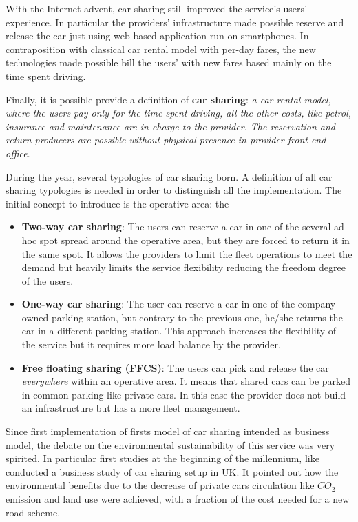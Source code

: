 With the Internet advent, car sharing still improved the service's users' experience. In particular the providers' infrastructure made possible reserve and release the car just using web-based application run on smartphones. 
In contraposition with classical car rental model with per-day fares, the new technologies made possible bill the users' with new fares based mainly on the time spent driving. 

Finally, it is possible provide a definition of \textbf{car sharing}: \textit{a car rental model, where the users pay only for the time spent driving, all the other costs, like petrol, insurance and maintenance are in charge to the provider. The reservation and return producers are possible without physical presence in provider front-end office}.

During the year, several typologies of car sharing born. A definition of all car sharing typologies is needed in order to distinguish all the implementation. The initial concept to introduce is the operative area: the 

\begin{itemize}
	\item \textbf{Two-way car sharing}: The users can reserve a car in one of the several ad-hoc spot spread around the operative area, but they are forced to return it in the same spot. It allows the providers to limit the fleet operations to meet the demand but heavily limits the service flexibility reducing the freedom degree of the users.
	
	\item \textbf{One-way car sharing}: The user can reserve a car in one of the company-owned parking station, but contrary to the previous one, he/she returns the car in a different parking station. This approach increases the flexibility of the service but it requires more load balance by the provider.
	
	\item \textbf{Free floating  sharing (FFCS)}: The users can pick and release the car \textit{everywhere} within an operative area. It means that shared cars can be parked in common parking like private cars. In this case the provider does not build an infrastructure but has a more fleet management.
\end{itemize}


Since first implementation of firsts model of car sharing intended as business model, the debate on the environmental sustainability of this service was very spirited. In particular first studies at the beginning of the millennium, like \cite{1_fellows2000economic} conducted a business study of car sharing setup in UK. It pointed out how the environmental benefits due to the decrease of private cars circulation like $CO_2$ emission and land use were achieved, with a fraction of the cost needed for a new road scheme.

